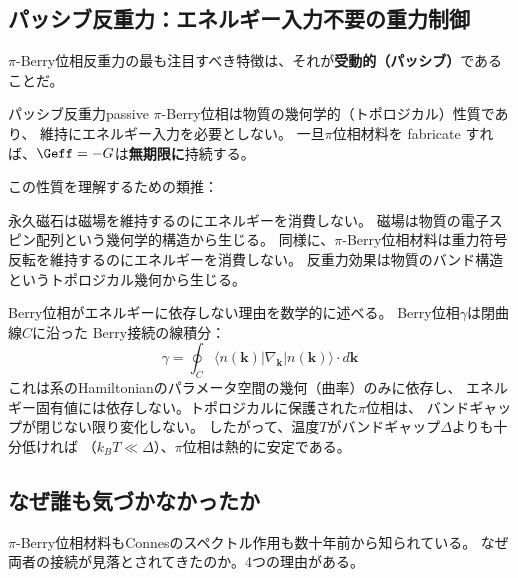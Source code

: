 \subsection{パッシブ反重力：エネルギー入力不要の重力制御}
\label{sec:12.3}

$\pi$-Berry位相反重力の最も注目すべき特徴は、それが\textbf{受動的（パッシブ）}であることだ。

\begin{keyresult}{パッシブ反重力}{passive}
$\pi$-Berry位相は物質の幾何学的（トポロジカル）性質であり、
維持にエネルギー入力を必要としない。
一旦$\pi$位相材料を fabricate すれば、$\Geff = -G$は\textbf{無期限に}持続する。
\end{keyresult}

\noindent
この性質を理解するための類推：

\begin{tcolorbox}[colback=green!5!white, colframe=green!60!black, title=類推：永久磁石]
永久磁石は磁場を維持するのにエネルギーを消費しない。
磁場は物質の電子スピン配列という幾何学的構造から生じる。
同様に、$\pi$-Berry位相材料は重力符号反転を維持するのにエネルギーを消費しない。
反重力効果は物質のバンド構造というトポロジカル幾何から生じる。
\end{tcolorbox}

\noindent
Berry位相がエネルギーに依存しない理由を数学的に述べる。
Berry位相$\gamma$は閉曲線$C$に沿った Berry接続の線積分：
\[
\gamma = \oint_C \langle n(\mathbf{k}) | \nabla_{\mathbf{k}} | n(\mathbf{k}) \rangle \cdot d\mathbf{k}
\]
これは系のHamiltonianのパラメータ空間の幾何（曲率）のみに依存し、
エネルギー固有値には依存しない。トポロジカルに保護された$\pi$位相は、
バンドギャップが閉じない限り変化しない。
したがって、温度$T$がバンドギャップ$\Delta$よりも十分低ければ
（$k_B T \ll \Delta$）、$\pi$位相は熱的に安定である。


\subsection{なぜ誰も気づかなかったか}
\label{sec:12.4}

$\pi$-Berry位相材料もConnesのスペクトル作用も数十年前から知られている。
なぜ両者の接続が見落とされてきたのか。4つの理由がある。

